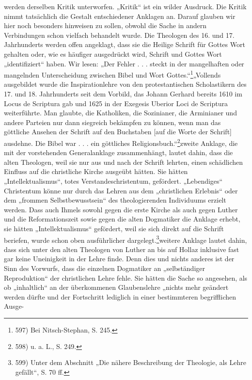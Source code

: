 werden derselben Kritik unterworfen. „Kritik“ ist ein wilder Ausdruck. Die Kritik nimmt tatsächlich die Gestalt entschiedener Anklagen an. Darauf glauben wir hier noch besonders hinweisen zu sollen, obwohl die Sache in andern Verbindungen schon vielfach behandelt wurde. Die Theologen des 16. und 17. Jahrhunderts werden offen angeklagt, dass sie die Heilige Schrift für Gottes Wort gehalten oder, wie es häufiger ausgedrückt wird, Schrift und Gottes Wort „identifiziert“ haben. Wir lesen: „Der Fehler . . . steckt in der mangelhaften oder mangelnden Unterscheidung zwischen Bibel und Wort Gottes.“\footnote{597) Bei Nitsch-Stephan, S. 245.}\n\n„Vollends ausgebildet wurde die Inspirationlehre von den protestantischen Scholastikern des 17. und 18. Jahrhunderts seit dem Vorbild, das Johann Gerhard bereits 1610 im Locus de Scriptura gab und 1625 in der Exegesis Uberior Loci de Scriptura weiterführte. Man glaubte, die Katholiken, die Sozinianer, die Arminianer und andere Parteien nur dann siegreich bekämpfen zu können, wenn man das göttliche Ansehen der Schrift auf den Buchstaben [auf die Worte der Schrift] ausdehne. Die Bibel war . . . ein göttliches Religionsbuch.“\footnote{598) u. a. L., S. 249.}\n\nEine zweite Anklage, die mit der vorstehenden Generalanklage zusammenhängt, lautet dahin, dass die alten Theologen, weil sie nur aus und nach der Schrift lehrten, einen schädlichen Einfluss auf die christliche Kirche ausgeübt hätten. Sie hätten „Intellektualismus“, totes Verstandeschristentum, gefördert. „Lebendiges“ Christentum könne nur durch das Lehren aus dem „christlichen Erlebnis“ oder dem „frommen Selbstbewusstsein“ des theologierenden Individuums erzielt werden. Dass auch Ihmels sowohl gegen die erste Kirche als auch gegen Luther und die Reformationszeit sowie gegen die alten Dogmatiker die Anklage erhebt, sie hätten „Intellektualismus“ gefördert, weil sie sich direkt auf die Schrift beriefen, wurde schon oben ausführlicher dargelegt.\footnote{599) Unter dem Abschnitt „Die nähere Beschreibung der Theologie, als Lehre gefällt“, S. 70 ff.}\n\nEine weitere Anklage lautet dahin, dass sich unter den alten Theologen von Luther an bis auf Hollaz inklusive fast gar keine Uneinigkeit in der Lehre finde. Denn dies und nichts anderes ist der Sinn des Vorwurfs, dass die einzelnen Dogmatiker an „selbständiger Reproduktion“ der christlichen Lehre fehle. Sie hätten die Sache so angesehen, als ob „inhaltlich“ an der überkommenen Glaubenslehre „nichts mehr geändert werden dürfte und der Fortschritt lediglich in einer bestimmteren begrifflichen Ausge-